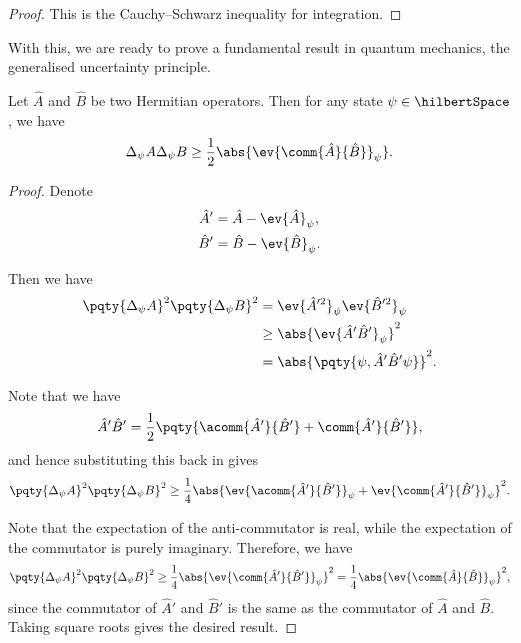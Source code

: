 \begin{proof}
    This is the Cauchy--Schwarz inequality for integration.
\end{proof}

With this, we are ready to prove a fundamental result in quantum mechanics, the generalised uncertainty principle.

\begin{theorem}
    Let \(\hat{A}\) and \(\hat{B}\) be two Hermitian operators. Then for any state \(\psi \in \hilbertSpace\), we have
    \begin{equation}
        \Delta_\psi A \Delta_\psi B \geq \frac{1}{2} \abs{\ev{\comm{\hat{A}}{\hat{B}}}_\psi}.
    \end{equation}
\end{theorem}

\begin{proof}
    Denote
    \begin{subequations}
        \begin{align}
            \hat{A}' &= \hat{A} - \ev{\hat{A}}_\psi, \\
            \hat{B}' &= \hat{B} - \ev{\hat{B}}_\psi.
        \end{align}
    \end{subequations}

    Then we have
    \begin{subequations}
        \begin{align}
            \pqty{\Delta_\psi A}^2 \pqty{\Delta_\psi B}^2 &= \ev{\hat{A}'^2}_\psi \ev{\hat{B}'^2}_\psi \\
            &\geq \abs{\ev{\hat{A}' \hat{B}'}_\psi}^2 \\
            &= \abs{\pqty{\psi, \hat{A}' \hat{B}' \psi}}^2.
        \end{align}
    \end{subequations}

    Note that we have
    \begin{equation}
        \hat{A}' \hat{B}' = \frac{1}{2} \pqty{\acomm{\hat{A}'}{\hat{B}'} + \comm{\hat{A}'}{\hat{B}'}},
    \end{equation}
    and hence substituting this back in gives
    \begin{equation}
        \pqty{\Delta_\psi A}^2 \pqty{\Delta_\psi B}^2 \geq \frac{1}{4} \abs{\ev{\acomm{\hat{A}'}{\hat{B}'}}_\psi + \ev{\comm{\hat{A}'}{\hat{B}'}}_\psi}^2.
    \end{equation}

    Note that the expectation of the anti-commutator is real, while the expectation of the commutator is purely imaginary. Therefore, we have
    \begin{equation}
        \pqty{\Delta_\psi A}^2 \pqty{\Delta_\psi B}^2 \geq \frac{1}{4} \abs{\ev{\comm{\hat{A}'}{\hat{B}'}}_\psi}^2 = \frac{1}{4} \abs{\ev{\comm{\hat{A}}{\hat{B}}}_\psi}^2,
    \end{equation}
    since the commutator of \(\hat{A}'\) and \(\hat{B}'\) is the same as the commutator of \(\hat{A}\) and \(\hat{B}\). Taking square roots gives the desired result.
\end{proof}

